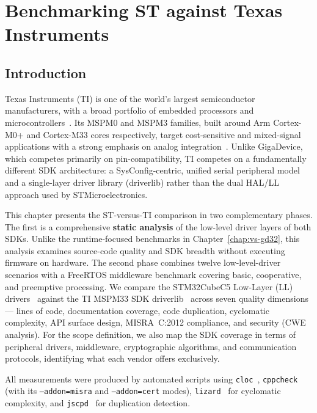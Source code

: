 \chapter{Benchmarking ST against Texas Instruments}
\label{chap:vs-ti}

\section*{Introduction}

Texas Instruments (TI) is one of the world's largest semiconductor manufacturers, with a
broad portfolio of embedded processors and microcontrollers~\cite{ti-about}. Its MSPM0 and
MSPM3 families, built around Arm Cortex-M0+ and Cortex-M33 cores respectively, target
cost-sensitive and mixed-signal applications with a strong emphasis on analog
integration~\cite{ti-mspm33-product}. Unlike GigaDevice, which competes primarily on
pin-compatibility, TI competes on a fundamentally different SDK architecture: a
SysConfig-centric, unified serial peripheral model and a single-layer driver library
(driverlib) rather than the dual HAL/LL approach used by STMicroelectronics.

This chapter presents the ST-versus-TI comparison in two complementary phases. The first is a
comprehensive \textbf{static analysis} of the low-level driver layers of both SDKs. Unlike the
runtime-focused benchmarks in Chapter~\ref{chap:vs-gd32}, this analysis examines source-code
quality and SDK breadth without executing firmware on hardware. The second phase combines
twelve low-level-driver scenarios with a FreeRTOS middleware benchmark covering basic,
cooperative, and preemptive processing. We compare the
STM32CubeC5 Low-Layer (LL) drivers~\cite{stm32cubec5-sw} against the TI MSPM33 SDK
driverlib~\cite{ti-mspm33-sdk} across seven quality dimensions --- lines of code,
documentation coverage, code duplication, cyclomatic complexity, API surface design,
MISRA~C:2012 compliance, and security (CWE analysis). For the scope definition, we also
map the SDK coverage in terms of peripheral drivers, middleware, cryptographic algorithms,
and communication protocols, identifying what each vendor offers exclusively.

All measurements were produced by automated scripts using
\texttt{cloc}~\cite{cloc-tool}, \texttt{cppcheck}~\cite{cppcheck-tool} (with its
\texttt{--addon=misra} and \texttt{--addon=cert} modes),
\texttt{lizard}~\cite{lizard-tool} for cyclomatic complexity, and
\texttt{jscpd}~\cite{jscpd-tool} for duplication detection.

